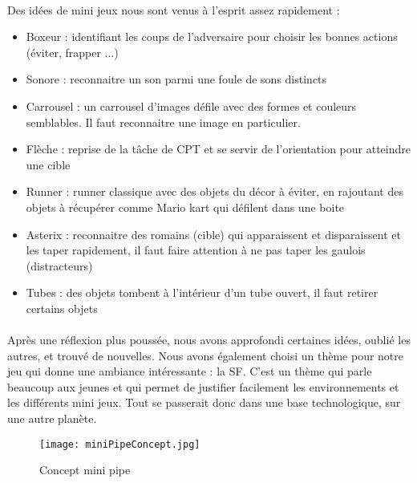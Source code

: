 \paragraph{}Des idées de mini jeux nous sont venus à l'esprit assez rapidement :
\begin{itemize}
\item Boxeur : identifiant les coups de l'adversaire pour choisir les bonnes actions (éviter, frapper ...)
\item Sonore : reconnaitre un son parmi une foule de sons distincts
\item Carrousel : un carrousel d'images défile avec des formes et couleurs semblables. Il faut reconnaitre une image en particulier.
\item Flèche : reprise de la tâche de CPT et se servir de l'orientation pour atteindre une cible
\item Runner : runner classique avec des objets du décor à éviter, en rajoutant des objets à récupérer comme Mario kart qui défilent dans une boite
\item Asterix : reconnaitre des romains (cible) qui apparaissent et disparaissent et les taper rapidement, il faut faire attention à ne pas taper les gaulois (distracteurs)
\item Tubes : des objets tombent à l'intérieur d'un tube ouvert, il faut retirer certains objets
\end{itemize}

\paragraph{}Après une réflexion plus poussée, nous avons approfondi certaines idées, oublié les autres, et trouvé de nouvelles. Nous avons également choisi un thème pour notre jeu qui
donne une ambiance intéressante : la \gls{SF}. C'est un thème qui parle beaucoup aux jeunes et qui permet de justifier facilement les environnements et les différents mini jeux. Tout
se passerait donc dans une base technologique, sur une autre planète.

\begin{wrapfigure}[11]{l}{6cm}
    \vspace{-25pt}
    \begin{center}
    \texttt{[image: miniPipeConcept.jpg]}
    \end{center}
    \captionsetup{labelformat=simpleNumber}
    \caption{Concept mini pipe}
\label{MiniPipeConcept}
\end{wrapfigure}

